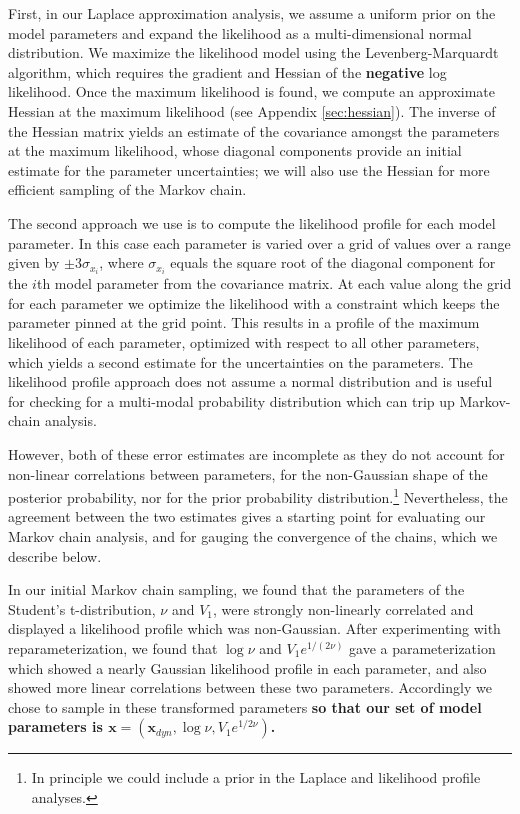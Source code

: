 \documentclass[twocolumn]{aastex63}
\begin{document}
First, in our Laplace approximation analysis, we assume a uniform prior on the model parameters and  expand the likelihood as a multi-dimensional normal distribution. 
We maximize the likelihood model using
the Levenberg-Marquardt algorithm, which requires the gradient and Hessian
of the \textbf{negative} log likelihood.  Once the maximum likelihood is found, we compute an approximate Hessian at the maximum likelihood (see Appendix \ref{sec:hessian}). The inverse of the Hessian matrix yields an estimate of the covariance amongst the
parameters at the maximum likelihood, whose diagonal components
provide an initial estimate for the parameter uncertainties; we will also use the Hessian for more efficient sampling of the
Markov chain.

The second approach we use is to compute the likelihood
profile for each model parameter.  In this case each parameter
is varied over a grid of values over a range given
by ${\pm}3\sigma_{x_i}$, where $\sigma_{x_i}$ equals the
square root of the diagonal component for the $i$th model
parameter from the covariance matrix.  At each value along
the grid for each parameter we optimize the likelihood with
a constraint which keeps the parameter pinned at the grid
point.  This results in a profile of the maximum likelihood of
each parameter, optimized with respect to all other parameters, which yields
a second estimate for the uncertainties on the parameters.
The likelihood profile approach does not assume a normal distribution and is useful for checking for
a multi-modal probability distribution which can trip up Markov-chain analysis.

However, both of these error estimates are incomplete as they
do not account for non-linear correlations between parameters, for the non-Gaussian shape of the posterior probability,
nor for the prior probability distribution.\footnote{In principle we could include a prior in the Laplace and likelihood profile analyses.}
Nevertheless, the agreement between the two estimates gives
a starting point for evaluating our Markov chain analysis, and
for gauging the convergence of the chains, which we describe below.

In our initial Markov chain sampling, we found that the parameters of the Student's t-distribution, $\nu$ and $V_1$, were strongly non-linearly correlated and displayed a likelihood profile which was non-Gaussian.   After experimenting with reparameterization, we found that $\log{\nu}$ and $V_1 e^{1/(2\nu)}$ gave a parameterization which showed a nearly Gaussian likelihood profile in each parameter, and also showed more linear correlations between these two parameters.  Accordingly we chose to sample in these transformed parameters
\textbf{so that our set of model parameters is $\mathbf{x} = (\mathbf{x}_{dyn},\log \nu, V_1 e^{1/2\nu})$.} 
\end{document}

